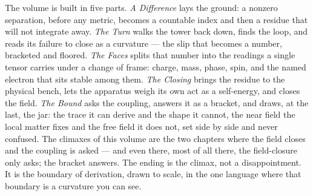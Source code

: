 The volume is built in five parts. \emph{A Difference} lays the ground: a nonzero separation, before any metric, becomes
a countable index and then a residue that will not integrate away. \emph{The Turn} walks the tower back down, finds the loop,
and reads its failure to close as a curvature --- the slip that becomes a number, bracketed and floored. \emph{The Faces}
splits that number into the readings a single tensor carries under a change of frame: charge, mass, phase, spin, and the
named electron that sits stable among them. \emph{The Closing} brings the residue to the physical bench, lets the apparatus
weigh its own act as a self-energy, and closes the field. \emph{The Bound} asks the coupling, answers it as a bracket, and
draws, at the last, the jar: the trace it can derive and the shape it cannot, the near field the local matter fixes and the
free field it does not, set side by side and never confused. The climaxes of this volume are the two chapters where the
field closes and the coupling is asked --- and even there, most of all there, the field-closure only asks; the bracket
answers. The ending is the climax, not a disappointment. It is the boundary of derivation, drawn to scale, in the one
language where that boundary is a curvature you can see.
